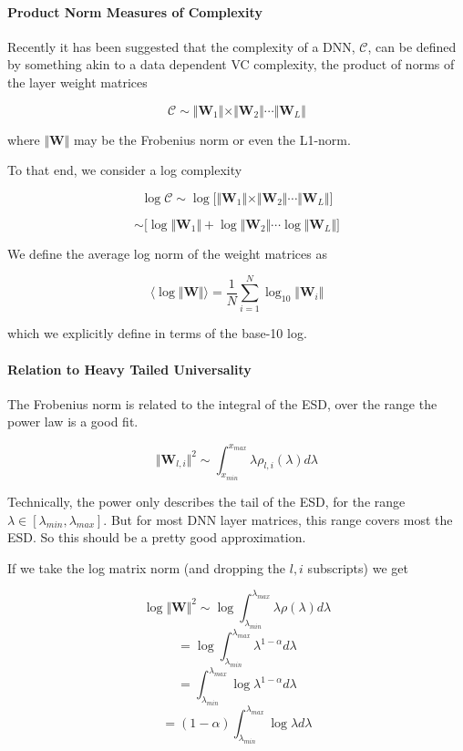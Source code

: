 \paragraph{Product Norm Measures of Complexity}

Recently it has been suggested that the complexity of a DNN, $\mathcal{C}$,  can be defined by something akin to a data dependent VC complexity, the product of norms of the layer weight matrices

$$\mathcal{C}\sim\Vert\mathbf{W}_{1}\Vert\times\Vert\mathbf{W}_{2}\Vert\cdots\Vert\mathbf{W}_{L}\Vert$$

where $\Vert\mathbf{W}\Vert$ may be the Frobenius norm or even the L1-norm.


 To that end, we consider a log complexity

$$\log\mathcal{C}\sim\log\bigg[\Vert\mathbf{W}_{1}\Vert\times\Vert\mathbf{W}_{2}\Vert\cdots\Vert\mathbf{W}_{L}\Vert\bigg]$$

$$\sim\bigg[\log\Vert\mathbf{W}_{1}\Vert+\log\Vert\mathbf{W}_{2}\Vert\cdots\log\Vert\mathbf{W}_{L}\Vert\bigg]$$

We define the average log norm of the weight matrices as

$$\langle\log\Vert\mathbf{W}\Vert\rangle=\dfrac{1}{N}\sum_{i=1}^{N}\log_{10}\Vert\mathbf{W}_{i}\Vert$$

which we explicitly define in terms of the base-10 log.

\paragraph{Relation to Heavy Tailed Universality}

The Frobenius norm is related to the integral of the ESD, over the range the power law is a good fit. 

$$\Vert\mathbf{W}_{l,i}\Vert^{2}\sim\int_{x_{min}}^{x_{max}}\lambda\rho_{l,i}(\lambda)d\lambda$$

Technically, the power only describes the tail of the ESD,  for the range $\lambda\in[\lambda_{min},\lambda_{max}]$.
  But for most DNN layer matrices, this range covers most the ESD.  So this should be a pretty good approximation.

If we take the log matrix norm (and dropping the $l,i$ subscripts) we get

$$\log\Vert\mathbf{W}\Vert^{2}\sim\log\int_{\lambda_{min}}^{\lambda_{max}}\lambda\rho(\lambda)d\lambda$$
$$=\log\int_{\lambda_{min}}^{\lambda_{max}}\lambda^{1-\alpha}d\lambda$$
$$=\int_{\lambda_{min}}^{\lambda_{max}}\log\lambda^{1-\alpha}d\lambda$$
$$=(1-\alpha)\int_{\lambda_{min}}^{\lambda_{max}}\log\lambda d\lambda$$

